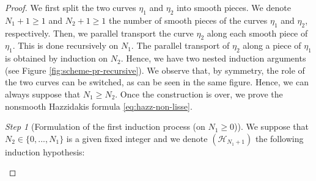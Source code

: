 \documentclass{article}
\renewcommand{\H}{\mathcal{H}}
\theoremstyle{remark}
\theoremstyle{prpart}
\newtheorem{proofpart}{Step}
\renewcommand{\H}{\mathcal{H}}
\begin{document}
\begin{proof}
  We first split the two curves $\eta_1$ and $\eta_2$ into smooth pieces. We denote $N_1+1\geq1$ and $N_2+1\geq1$ the number of smooth pieces of the curves $\eta_1$ and $\eta_2$, respectively. Then, we parallel transport the curve $\eta_2$ along each smooth piece of $\eta_1$. This is done recursively on $N_1$. The parallel transport of $\eta_2$ along a piece of $\eta_1$ is obtained by induction on $N_2$. Hence, we have two nested induction arguments (see Figure \ref{fig:scheme-pr-recursive}). We observe that, by symmetry, the role of the two curves can be switched, as can be seen in the same figure. Hence, we can always suppose that $N_1\geq N_2$. Once the construction is over, we prove the nonsmooth Hazzidakis formula \eqref{eq:hazz-non-lisse}. 
  \begin{proofpart}[Formulation of the first induction process (on $N_1\geq0$)]
    We suppose that $N_2\in\{0,...,N_1\}$ is a given fixed integer and we denote $(\H_{N_1+1})$ the following induction hypothesis:


\end{proofpart}
\end{proof}
\end{document}
